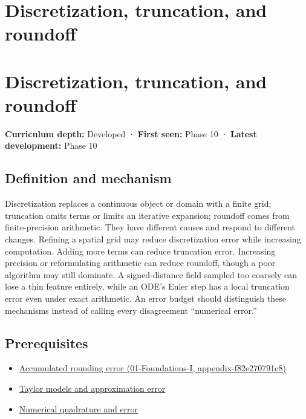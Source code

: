 \hypertarget{appendix-6b0648b2b8e8}{}
\section*{Discretization, truncation, and roundoff}
\section{Discretization, truncation, and roundoff}\label{appendix-6b0648b2b8e8-discretization-truncation-and-roundoff}

\textbf{Curriculum depth:} Developed · \textbf{First seen:} Phase 10 · \textbf{Latest development:} Phase 10

\subsection{Definition and mechanism}\label{appendix-6b0648b2b8e8-definition-and-mechanism}

Discretization replaces a continuous object or domain with a finite grid; truncation omits terms or limits an iterative expansion; roundoff comes from finite-precision arithmetic. They have different causes and respond to different changes. Refining a spatial grid may reduce discretization error while increasing computation. Adding more terms can reduce truncation error. Increasing precision or reformulating arithmetic can reduce roundoff, though a poor algorithm may still dominate. A signed-distance field sampled too coarsely can lose a thin feature entirely, while an ODE's Euler step has a local truncation error even under exact arithmetic. An error budget should distinguish these mechanisms instead of calling every disagreement ``numerical error.''

\subsection{Prerequisites}\label{appendix-6b0648b2b8e8-prerequisites}

\begin{itemize}
\tightlist
\item
  \href{../01-Foundations-I/main.pdf\#nameddest=appendix-f82e270791c8}{Accumulated rounding error (01-Foundations-I, appendix-f82e270791c8)}
\item
  \hyperref[appendix-32f39e9a3738]{Taylor models and approximation error}
\item
  \hyperref[appendix-80521eae6b71]{Numerical quadrature and error}
\end{itemize}

